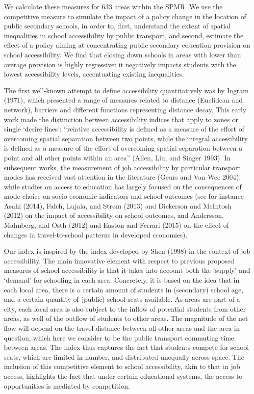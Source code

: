 \documentclass[]{article}
\begin{document}
We calculate these measures for 633
areas within the SPMR. We use the competitive measure to simulate the
impact of a policy change in the location of public secondary schools,
in order to, first, understand the extent of spatial inequalities in
school accessibility by public transport, and second, estimate the
effect of a policy aiming at concentrating public secondary education
provision on school accessibility. We find that closing down schools in
areas with lower than average provision is highly regressive: it
negatively impacts students with the lowest accessibility levels,
accentuating existing inequalities.

The first well-known attempt to define accessibility quantitatively was
by Ingram (1971), which presented a range of measures related to
distance (Euclidean and network), barriers and different functions
representing distance decay. This early work made the distinction
between accessibility indices that apply to zones or single `desire
lines': ``relative accessibility is defined as a measure of the effort
of overcoming spatial separation between two points, while the integral
accessibility is defined as a measure of the effort of overcoming
spatial separation between a point and all other points within an area''
(Allen, Liu, and Singer 1993). In subsequent works, the measurement of
job accessibility by particular transport modes has received vast
attention in the literature (Geurs and Van Wee 2004), while studies on
access to education has largely focused on the consequences of mode
choice on socio-economic indicators and school outcomes (see for
instance Asahi (2014), Falch, Lujala, and Str{ø}m (2013) and Dickerson
and McIntosh (2012) on the impact of accessibility on school outcomes,
and Andersson, Malmberg, and {Ö}sth (2012) and Easton and Ferrari (2015)
on the effect of changes in travel-to-school patterns in developed
economies).

Our index is inspired by the index developed by Shen (1998) in the
context of job accessibility. The main innovative element with respect
to previous proposed measures of school accessibility is that it takes
into account both the `supply' and `demand' for schooling in each area.
Concretely, it is based on the idea that in each local area, there is a
certain amount of students in (secondary) school age, and a certain
quantity of (public) school seats available. As areas are part of a
city, each local area is also subject to the inflow of potential
students from other areas, as well of the outflow of students to other
areas. The magnitude of the net flow will depend on the travel distance
between all other areas and the area in question, which here we consider
to be the public transport commuting time between areas. The index thus
captures the fact that students compete for school seats, which are
limited in number, and distributed unequally across space. The inclusion
of this competitive element to school accessibility, akin to that in job
access, highlights the fact that under certain educational systems, the
access to opportunities is mediated by competition.
\end{document}
